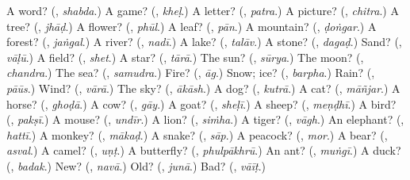\begin{tcolorbox}[breakable,colback=teal!4,colframe=teal!35!black,title={Before you move on}]
A word? (\textbf{}, \emph{shabda}.) A game? (\textbf{}, \emph{kheḷ}.) A letter? (\textbf{}, \emph{patra}.) A picture? (\textbf{}, \emph{chitra}.) A tree? (\textbf{}, \emph{jhāḍ}.) A flower? (\textbf{}, \emph{phūl}.) A leaf? (\textbf{}, \emph{pān}.) A mountain? (\textbf{}, \emph{ḍoṅgar}.) A forest? (\textbf{}, \emph{jaṅgal}.) A river? (\textbf{}, \emph{nadī}.) A lake? (\textbf{}, \emph{talāv}.) A stone? (\textbf{}, \emph{dagaḍ}.) Sand? (\textbf{}, \emph{vāḷū}.) A field? (\textbf{}, \emph{shet}.) A star? (\textbf{}, \emph{tārā}.) The sun? (\textbf{}, \emph{sūrya}.) The moon? (\textbf{}, \emph{chandra}.) The sea? (\textbf{}, \emph{samudra}.) Fire? (\textbf{}, \emph{āg}.) Snow; ice? (\textbf{}, \emph{barpha}.) Rain? (\textbf{}, \emph{pāūs}.) Wind? (\textbf{}, \emph{vārā}.) The sky? (\textbf{}, \emph{ākāsh}.) A dog? (\textbf{}, \emph{kutrā}.) A cat? (\textbf{}, \emph{māñjar}.) A horse? (\textbf{}, \emph{ghoḍā}.) A cow? (\textbf{}, \emph{gāy}.) A goat? (\textbf{}, \emph{sheḷī}.) A sheep? (\textbf{}, \emph{meṇḍhī}.) A bird? (\textbf{}, \emph{pakṣī}.) A mouse? (\textbf{}, \emph{undīr}.) A lion? (\textbf{}, \emph{siṁha}.) A tiger? (\textbf{}, \emph{vāgh}.) An elephant? (\textbf{}, \emph{hattī}.) A monkey? (\textbf{}, \emph{mākaḍ}.) A snake? (\textbf{}, \emph{sāp}.) A peacock? (\textbf{}, \emph{mor}.) A bear? (\textbf{}, \emph{asval}.) A camel? (\textbf{}, \emph{uṇṭ}.) A butterfly? (\textbf{}, \emph{phulpākhrū}.) An ant? (\textbf{}, \emph{muṅgī}.) A duck? (\textbf{}, \emph{badak}.) New? (\textbf{}, \emph{navā}.) Old? (\textbf{}, \emph{junā}.) Bad? (\textbf{}, \emph{vāīṭ}.)
\end{tcolorbox}
